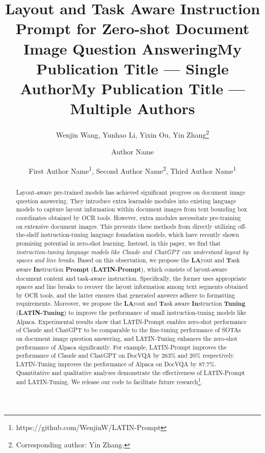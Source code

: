 \documentclass[letterpaper]{article} \usepackage{aaai24_preprint}  \usepackage{times}  \usepackage{helvet}  \usepackage{courier}  \usepackage[hyphens]{url}  \usepackage{graphicx} \urlstyle{rm} \def\UrlFont{\rm}  \usepackage{natbib}  \usepackage{caption} \frenchspacing  \setlength{\pdfpagewidth}{8.5in} \setlength{\pdfpageheight}{11in} \usepackage{algorithm}
\title{Layout and Task Aware Instruction Prompt for Zero-shot Document Image Question Answering}
\author{
Wenjin Wang, Yunhao Li, Yixin Ou, Yin Zhang\thanks{Corresponding author: Yin Zhang.}
}
\title{My Publication Title --- Single Author}
\author {
    Author Name
}
\title{My Publication Title --- Multiple Authors}
\author {
First Author Name\textsuperscript{\rm 1},
    Second Author Name\textsuperscript{\rm 2},
    Third Author Name\textsuperscript{\rm 1}
}
\begin{document}
\maketitle

\begin{abstract}
Layout-aware pre-trained models has achieved significant progress on document image question answering.
They introduce extra learnable modules into existing language models to capture layout information within document images from text bounding box coordinates obtained by OCR tools.
However, extra modules necessitate pre-training on extensive document images.
This prevents these methods from directly utilizing off-the-shelf instruction-tuning language foundation models, which have recently shown promising potential in zero-shot learning.
Instead, in this paper, we find that \emph{instruction-tuning language models like Claude and ChatGPT can understand layout by spaces and line breaks}.
Based on this observation, we propose the \textbf{LA}yout and \textbf{T}ask aware \textbf{In}struction \textbf{Prompt} (\textbf{LATIN-Prompt}), which consists of layout-aware document content and task-aware instruction.
Specifically, the former uses appropriate spaces and line breaks to recover the layout information among text segments obtained by OCR tools, and the latter ensures that generated answers adhere to formatting requirements.
Moreover, we propose the \textbf{LA}yout and \textbf{T}ask aware \textbf{In}struction \textbf{Tuning} (\textbf{LATIN-Tuning}) to improve the performance of small instruction-tuning models like Alpaca.
Experimental results show that LATIN-Prompt enables zero-shot performance of Claude and ChatGPT to be comparable to the fine-tuning performance of SOTAs on document image question answering, and LATIN-Tuning enhances the zero-shot performance of Alpaca significantly.
For example, LATIN-Prompt improves the performance of Claude and ChatGPT on DocVQA by $263\%$ and $20\%$ respectively.
LATIN-Tuning improves the performance of Alpaca on DocVQA by $87.7\%$.
Quantitative and qualitative analyses demonstrate the effectiveness of LATIN-Prompt and LATIN-Tuning.
We release our code to facilitate future research\footnote{https://github.com/WenjinW/LATIN-Prompt}.
\end{abstract}
\end{document}
